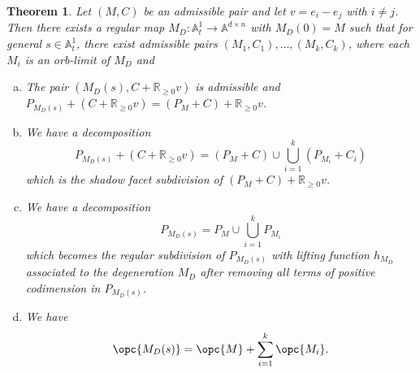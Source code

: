\documentclass[12pt]{amsart}
\newcommand{\mb}{\mathbb}
\theoremstyle{plain}
\newtheorem{Thm}{Theorem}[section]
\theoremstyle{definition}
\theoremstyle{remark}
\begin{document}
\begin{Thm} \label{explsub}
Let $(M,C)$ be an admissible pair and let $v = e_i - e_j$ with $i \neq j$. Then there exists a regular map $M_D : \mb{A}^1_t \to \mb{A}^{d \times n}$ with $M_D(0)=M$ such that for general $s \in \mb{A}^1_t$, there exist admissible pairs $(M_1, C_1), \ldots, (M_k, C_k)$, where each $M_i$ is an orb-limit of $M_D$ and
\begin{enumerate}[(a)]
\item The pair $(M_D(s), C + \mb{R}_{\geq 0} v)$ is admissible and $P_{M_D(s)} + (C + \mb{R}_{\geq 0} v) = (P_{M} + C) + \mb{R}_{\geq 0} v$.
\item We have a decomposition \[P_{M_D(s)} + (C + \mb{R}_{\geq 0} v) = (P_{M} + C) \cup \bigcup_{i=1}^k (P_{M_i} + C_i)\] which is the shadow facet subdivision of $(P_{M} + C) + \mb{R}_{\geq 0} v$.
\item We have a decomposition \[P_{M_D(s)} = P_{M} \cup \bigcup_{i=1}^k P_{M_i}\] which becomes the regular subdivision of $P_{M_D(s)}$ with lifting function $h_{M_D}$ associated to the degeneration $M_D$ after removing all terms of positive codimension in $P_{M_D(s)}$.
\item We have \[\opc{M_D(s)} = \opc{M} + \sum_{i=1}^k \opc{M_i}.\]
\end{enumerate}

\end{Thm}
\end{document}
